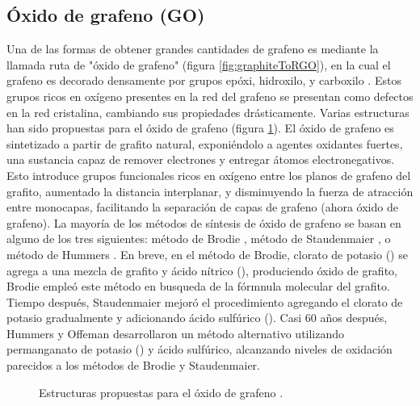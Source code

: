 \subsection{Óxido de grafeno (GO)}
Una de las formas de obtener grandes cantidades de grafeno es mediante la llamada ruta de "óxido de grafeno" (figura \ref{fig:graphiteToRGO}), en la cual el grafeno es decorado densamente por grupos epóxi, hidroxilo, y carboxilo \citep{Dreyer2010}. Estos grupos ricos en oxígeno presentes en la red del grafeno se presentan como defectos en la red cristalina, cambiando sus propiedades drásticamente. Varias estructuras han sido propuestas para el óxido de grafeno (figura \ref{fig:GO_structure}).
El óxido de grafeno es sintetizado a partir de grafito natural, exponiéndolo a agentes oxidantes fuertes, una sustancia capaz de remover electrones y entregar átomos electronegativos. Esto introduce grupos funcionales ricos en oxígeno entre los planos de grafeno del grafito, aumentado la distancia interplanar, y disminuyendo la fuerza de atracción entre monocapas, facilitando la separación de capas de grafeno (ahora óxido de grafeno). La mayoría de los métodos de síntesis de óxido de grafeno se basan en alguno de los tres siguientes: método de Brodie \citep{Brodie1859}, método de Staudenmaier \citep{Staudenmaier1898}, o método de Hummers \citep{Hummers1958}. En breve, en el método de Brodie, clorato de potasio () se agrega a una mezcla de grafito y ácido nítrico (), produciendo óxido de grafito, Brodie empleó este método en busqueda de la fórmnula molecular del grafito. Tiempo después, Staudenmaier mejoró el procedimiento agregando el clorato de potasio gradualmente y adicionando ácido sulfúrico (). Casi 60 años después, Hummers y Offeman desarrollaron un método alternativo utilizando permanganato de potasio () y ácido sulfúrico, alcanzando niveles de oxidación parecidos a los métodos de Brodie y Staudenmaier.

\begin{figure}
	\centering
	\caption[Estructura de óxido de grafeno]{Estructuras propuestas para el óxido de grafeno \citep{Dreyer2010}.}
	\label{fig:GO_structure}
\end{figure}


